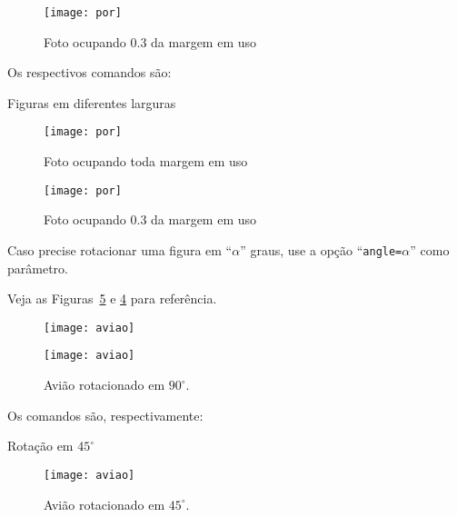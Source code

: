 \begin{figure}[!htbp] 
\centering 
\texttt{[image: por]}
\caption{Foto ocupando 0.3 da margem em uso}
\label{fig:amargosa2}
\end{figure}


Os respectivos comandos são:

\begin{codigo}{Figuras em diferentes larguras}{\lapis}
\begin{figure}[!htbp] 
  \centering 
  \texttt{[image: por]} 
  \caption{Foto ocupando toda margem em uso}
  \label{fig:amargosa1}
\end{figure}

\begin{figure}[!htbp] 
  \centering 
  \texttt{[image: por]}
  \caption{Foto ocupando 0.3 da margem em uso}
  \label{fig:amargosa2}
\end{figure}
\end{codigo}

Caso precise rotacionar uma figura em ``$\alpha$'' graus, use a opção 
``\texttt{angle=$\alpha$}'' como parâmetro.

Veja as Figuras~\ref{fig:avi2} e \ref{fig:avi3} para referência.

\begin{figure}[!htbp]
	\centering
		\begin{minipage}[t]{0.48\linewidth}
			\begin{center}
				\texttt{[image: aviao]}
			\end{center}
					\caption{Avião rotacionado em $45^{\circ}$.}
					\label{fig:avi2}
		\end{minipage}
\hfill
		\begin{minipage}[t]{0.48\linewidth}
			\begin{center}
				\texttt{[image: aviao]}
			\end{center}
				\caption{Avião rotacionado em $90^{\circ}$.}
				\label{fig:avi3}
		\end{minipage}
\end{figure}

Os comandos são, respectivamente:

\begin{codigo}{Rotação em $45^{\circ}$}{\lapis}
\begin{figure}[!htbp]
\centering
\texttt{[image: aviao]}
\caption{Avião rotacionado em $45^{\circ}$.}
\label{fig:avi2}
\end{figure}
\end{codigo}

